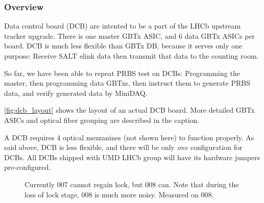 \subsubsection{Overview}
Data control board (DCB) are intented to be a part of the LHCb upstream tracker
upgrade.
There is one master GBTx ASIC, and 6 data GBTx ASICs per board.
DCB is much less flexible than GBTx DB, because it serves only one purpose:
Receive SALT elink data then transmit that data to the counting room.

So far, we have been able to repeat PRBS test on DCBs:
Programming the master, then programming data GBTxs, then instruct them to
generate PRBS data, and verify generated data by MiniDAQ.

\autoref{fig:dcb_layout} shows the layout of an actual DCB board.
More detailed GBTx ASICs and optical fiber grouping are described in the
caption.

A DCB requires 4 optical mezzanines (not shown here) to function properly.
As said above, DCB is less flexible, and there will be only \emph{one}
configuration for DCBs.
All DCBs shipped with UMD LHCb group will have its hardware jumpers
pre-configured.

\begin{figure}[!ht]
\centering
{}
\caption{
    Currently 007 cannot regain lock, but 008 can.
    Note that during the loss of lock stage, 008 is much more noisy.
    Measured on 008.
}
\label{fig:dcb_layout}
\end{figure}
